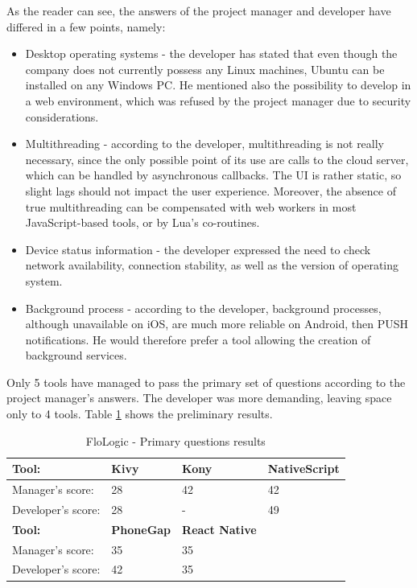 \documentclass[english,master,public,dept460,male,cpdeclaration,oneside]{diploma}
\begin{document}
As the reader can see, the answers of the project manager and developer have differed in a few points, namely:
\begin{itemize}
	\item Desktop operating systems - the developer has stated that even though the company does not currently possess any Linux machines, Ubuntu can be installed on any Windows PC. He mentioned also the possibility to develop in a web environment, which was refused by the project manager due to security considerations.
	\item Multithreading - according to the developer, multithreading is not really necessary, since the only possible point of its use are calls to the cloud server, which can be handled by asynchronous callbacks. The UI is rather static, so slight lags should not impact the user experience. Moreover, the absence of true multithreading can be compensated with web workers in most JavaScript-based tools, or by Lua’s co-routines.
	\item Device status information - the developer expressed the need to check network availability, connection stability, as well as the version of operating system.
	\item Background process - according to the developer, background processes, although unavailable on iOS, are much more reliable on Android, then PUSH notifications. He would therefore prefer a tool allowing the creation of background services.
\end{itemize}

Only 5 tools have managed to pass the primary set of questions according to the project manager’s answers. The developer was more demanding, leaving space only to 4 tools. Table \ref{table:flologicResults1} shows the preliminary results.

\begin{table}[!h]
	\centering
	\caption{FloLogic - Primary questions results}
	\label{table:flologicResults1}
	\begin{tabular}{p{4cm} | p{3cm} | p{3cm} | p{3cm}}
		\toprule		
		\textbf{Tool:} & \textbf{Kivy} & \textbf{Kony} & \textbf{NativeScript} \\
		\midrule
		Manager’s score: & 28 & 42 & 42 \\
		Developer’s score: & 28 & - & 49 \\ 
		\midrule
		\textbf{Tool:} & \textbf{PhoneGap} & \textbf{React Native} & \\
		\midrule
		Manager’s score: & 35 & 35 & \\
		Developer’s score: & 42 & 35 & \\			
		\midrule
	\end{tabular}
\end{table}
\end{document}
